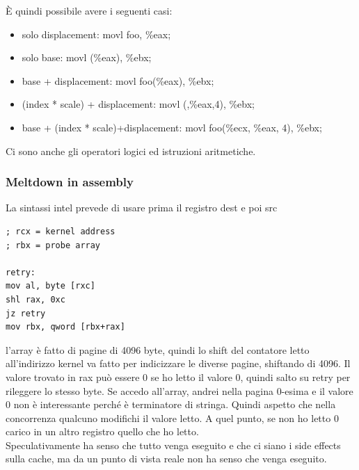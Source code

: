 \documentclass[14pt, oneside]{book}
\begin{document}
È quindi possibile avere i seguenti casi:
\begin{itemize}
\item solo displacement: \textsf{movl foo, \%eax};
\item solo base: \textsf{movl (\%eax), \%ebx};
\item base + displacement: \textsf{movl foo(\%eax), \%ebx};
\item (index * scale) + displacement: \textsf{movl (,\%eax,4), \%ebx};
\item base + (index * scale)+displacement: \textsf{movl foo(\%ecx, \%eax, 4), \%ebx};
\end{itemize}
Ci sono anche gli operatori logici ed istruzioni aritmetiche.
\subsubsection{Meltdown in assembly}
La sintassi intel prevede di usare prima il registro dest e poi src
\begin{lstlisting}
; rcx = kernel address
; rbx = probe array

retry:
mov al, byte [rxc]
shl rax, 0xc
jz retry
mov rbx, qword [rbx+rax]
\end{lstlisting}
l'array è fatto di pagine di 4096 byte, quindi lo shift del contatore letto all'indirizzo kernel va fatto per indicizzare le diverse pagine, shiftando di 4096. Il valore trovato in rax può essere 0 se ho letto il valore 0, quindi salto su retry per rileggere lo stesso byte. Se accedo all'array, andrei nella pagina 0-esima e il valore 0 non è interessante perché è terminatore di stringa. Quindi aspetto che nella concorrenza qualcuno modifichi il valore letto. A quel punto, se non ho letto 0 carico in un altro registro quello che ho letto.\\ Speculativamente ha senso che tutto venga eseguito e che ci siano i side effects sulla cache, ma da un punto di vista reale non ha senso che venga eseguito.
\end{document}
